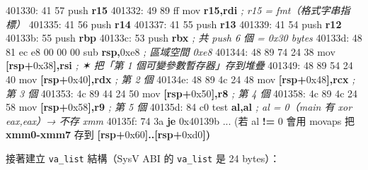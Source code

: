\documentclass[10pt,a4paper]{article}
\newenvironment{Shaded}{\begin{snugshade}}{\end{snugshade}}
\newcommand{\BaseNTok}[1]{\textcolor[rgb]{0.00,0.00,0.81}{#1}}
\newcommand{\BuiltInTok}[1]{#1}
\newcommand{\CommentTok}[1]{\textcolor[rgb]{0.56,0.35,0.01}{\textit{#1}}}
\newcommand{\ControlFlowTok}[1]{\textcolor[rgb]{0.13,0.29,0.53}{\textbf{#1}}}
\newcommand{\DecValTok}[1]{\textcolor[rgb]{0.00,0.00,0.81}{#1}}
\newcommand{\KeywordTok}[1]{\textcolor[rgb]{0.13,0.29,0.53}{\textbf{#1}}}
\newcommand{\NormalTok}[1]{#1}
\newcommand{\OperatorTok}[1]{\textcolor[rgb]{0.81,0.36,0.00}{\textbf{#1}}}
\renewenvironment{Shaded}{%
  \def\FrameCommand{\fboxsep=3.2pt\colorbox{shadecolor}}%
  \MakeFramed{\advance\hsize-\width\FrameRestore\small}%
}{%
  \endMakeFramed
}
\begin{document}
\begin{Shaded}
\begin{Highlighting}[]
\NormalTok{  401330: 41 57              }\BuiltInTok{push} \KeywordTok{r15}
\NormalTok{  401332: 49 89 ff           mov  }\KeywordTok{r15}\OperatorTok{,}\KeywordTok{rdi}        \CommentTok{; r15 = fmt（格式字串指標）}
\NormalTok{  401335: 41 56              }\BuiltInTok{push} \KeywordTok{r14}
\NormalTok{  401337: 41 55              }\BuiltInTok{push} \KeywordTok{r13}
\NormalTok{  401339: 41 54              }\BuiltInTok{push} \KeywordTok{r12}
\NormalTok{  40133b: 55                 }\BuiltInTok{push} \KeywordTok{rbp}
\NormalTok{  40133c: 53                 }\BuiltInTok{push} \KeywordTok{rbx}            \CommentTok{; 共 push 6 個 = 0x30 bytes}
\NormalTok{  40133d: 48 81 ec e8 }\DecValTok{00} \DecValTok{00} \DecValTok{00}\NormalTok{  sub }\KeywordTok{rsp}\OperatorTok{,}\BaseNTok{0xe8}     \CommentTok{; 區域空間 0xe8}
\NormalTok{  401344: 48 89 74 24 38     }\BuiltInTok{mov}  \OperatorTok{[}\KeywordTok{rsp}\OperatorTok{+}\BaseNTok{0x38}\OperatorTok{],}\KeywordTok{rsi} \CommentTok{; ✶ 把「第 1 個可變參數暫存器」存到堆疊}
\NormalTok{  401349: 48 89 54 24 40     }\BuiltInTok{mov}  \OperatorTok{[}\KeywordTok{rsp}\OperatorTok{+}\BaseNTok{0x40}\OperatorTok{],}\KeywordTok{rdx} \CommentTok{; 第 2 個}
\NormalTok{  40134e: 48 89 4c 24 48     }\BuiltInTok{mov}  \OperatorTok{[}\KeywordTok{rsp}\OperatorTok{+}\BaseNTok{0x48}\OperatorTok{],}\KeywordTok{rcx} \CommentTok{; 第 3 個}
\NormalTok{  401353: 4c 89 44 24 50     }\BuiltInTok{mov}  \OperatorTok{[}\KeywordTok{rsp}\OperatorTok{+}\BaseNTok{0x50}\OperatorTok{],}\KeywordTok{r8}  \CommentTok{; 第 4 個}
\NormalTok{  401358: 4c 89 4c 24 58     }\BuiltInTok{mov}  \OperatorTok{[}\KeywordTok{rsp}\OperatorTok{+}\BaseNTok{0x58}\OperatorTok{],}\KeywordTok{r9}  \CommentTok{; 第 5 個}
\NormalTok{  40135d: 84 c0              test }\KeywordTok{al}\OperatorTok{,}\KeywordTok{al}          \CommentTok{; al = 0（main 有 xor eax,eax）→ 不存 xmm}
\NormalTok{  40135f: 74 3a              }\ControlFlowTok{je}   \BaseNTok{0x40139b}
\NormalTok{  ... (若 al }\OperatorTok{!=} \DecValTok{0}\NormalTok{ 會用 movaps 把 }\KeywordTok{xmm0}\OperatorTok{{-}}\KeywordTok{xmm7}\NormalTok{ 存到 }\OperatorTok{[}\KeywordTok{rsp}\OperatorTok{+}\BaseNTok{0x60}\OperatorTok{]..[}\KeywordTok{rsp}\OperatorTok{+}\BaseNTok{0xd0}\OperatorTok{])}
\end{Highlighting}
\end{Shaded}

接著建立 \texttt{va\_\allowbreak{}list} 結構（SysV ABI 的 \texttt{va\_\allowbreak{}list} 是 24
bytes）：
\end{document}
